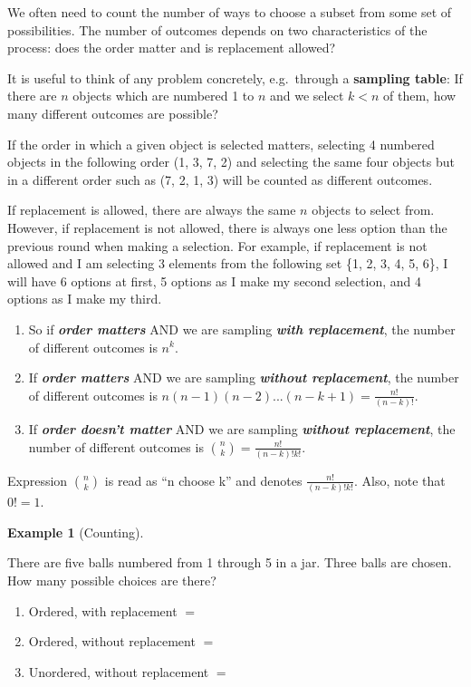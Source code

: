 \documentclass[
  letterpaper,
]{book}
\theoremstyle{definition}
\theoremstyle{definition}
\newtheorem{example}{Example}[chapter]
\theoremstyle{plain}
\theoremstyle{definition}
\theoremstyle{plain}
\theoremstyle{plain}
\theoremstyle{remark}
\begin{document}
We often need to count the number of ways to choose a subset from some
set of possibilities. The number of outcomes depends on two
characteristics of the process: does the order matter and is replacement
allowed?

It is useful to think of any problem concretely, e.g.~through a
\textbf{sampling table}: If there are \(n\) objects which are numbered 1
to \(n\) and we select \(k < n\) of them, how many different outcomes
are possible?

If the order in which a given object is selected matters, selecting 4
numbered objects in the following order (1, 3, 7, 2) and selecting the
same four objects but in a different order such as (7, 2, 1, 3) will be
counted as different outcomes.

If replacement is allowed, there are always the same \(n\) objects to
select from. However, if replacement is not allowed, there is always one
less option than the previous round when making a selection. For
example, if replacement is not allowed and I am selecting 3 elements
from the following set \{1, 2, 3, 4, 5, 6\}, I will have 6 options at
first, 5 options as I make my second selection, and 4 options as I make
my third.

\begin{enumerate}
\def\labelenumi{\arabic{enumi}.}
\item
  So if \textbf{\emph{order matters}} AND we are sampling
  \textbf{\emph{with replacement}}, the number of different outcomes is
  \(n^k\).
\item
  If \textbf{\emph{order matters}} AND we are sampling
  \textbf{\emph{without replacement}}, the number of different outcomes
  is \(n(n-1)(n-2)...(n-k+1)=\frac{n!}{(n-k)!}\).
\item
  If \textbf{\emph{order doesn't matter}} AND we are sampling
  \textbf{\emph{without replacement}}, the number of different outcomes
  is \(\binom{n}{k} = \frac{n!}{(n-k)!k!}\).
\end{enumerate}

Expression \(\binom{n}{k}\) is read as ``n choose k'' and denotes
\(\frac{n!}{(n-k)!k!}\). Also, note that \(0! = 1\).

\leavevmode{}%
\begin{example}[Counting]\label{exm-counting}

There are five balls numbered from 1 through 5 in a jar. Three balls are
chosen. How many possible choices are there?

\begin{enumerate}
\def\labelenumi{\arabic{enumi}.}
\item
  Ordered, with replacement \(=\)
\item
  Ordered, without replacement \(=\)
\item
  Unordered, without replacement \(=\)
\end{enumerate}

\end{example}
\end{document}
